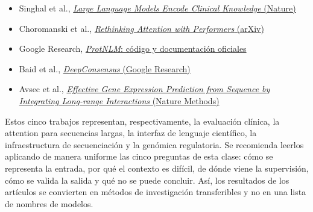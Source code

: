 \begin{itemize}
  \item Singhal et al., \href{https://www.nature.com/articles/s41586-023-06291-2}{\emph{Large Language Models Encode Clinical Knowledge} (Nature)}
  \item Choromanski et al., \href{https://arxiv.org/abs/2009.14794}{\emph{Rethinking Attention with Performers} (arXiv)}
  \item Google Research, \href{https://github.com/google-research/google-research/tree/master/protnlm}{\emph{ProtNLM}: código y documentación oficiales}
  \item Baid et al., \href{https://research.google/pubs/deepconsensus-improves-the-accuracy-of-sequences-with-a-gap-aware-sequence-transformer/}{\emph{DeepConsensus} (Google Research)}
  \item Avsec et al., \href{https://www.nature.com/articles/s41592-021-01252-x}{\emph{Effective Gene Expression Prediction from Sequence by Integrating Long-range Interactions} (Nature Methods)}
\end{itemize}

Estos cinco trabajos representan, respectivamente, la evaluación clínica, la attention para secuencias largas, la interfaz de lenguaje científico, la infraestructura de secuenciación y la genómica regulatoria. Se recomienda leerlos aplicando de manera uniforme las cinco preguntas de esta clase: cómo se representa la entrada, por qué el contexto es difícil, de dónde viene la supervisión, cómo se valida la salida y qué no se puede concluir. Así, los resultados de los artículos se convierten en métodos de investigación transferibles y no en una lista de nombres de modelos.


